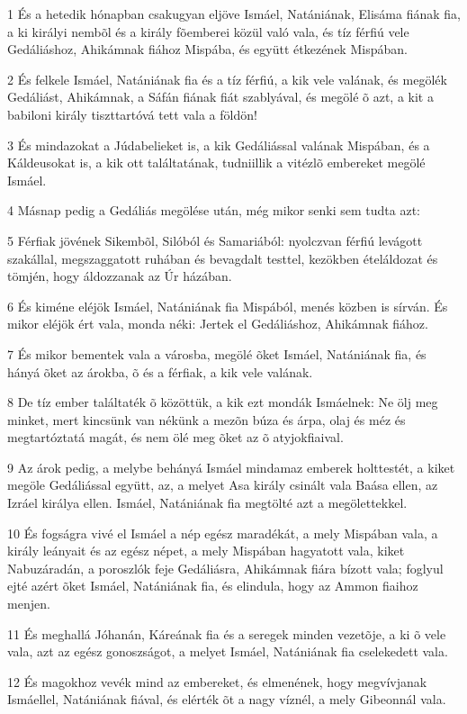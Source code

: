 \par 1 És a hetedik hónapban csakugyan eljöve Ismáel, Natániának, Elisáma fiának fia, a ki királyi nembõl és a király fõemberei közül való vala, és tíz férfiú vele Gedáliáshoz, Ahikámnak fiához Mispába, és együtt étkezének Mispában.
\par 2 És felkele Ismáel, Natániának fia és a tíz férfiú, a kik vele valának, és megölék Gedáliást, Ahikámnak, a Sáfán fiának fiát szablyával, és megölé õ azt, a kit a babiloni király tiszttartóvá tett vala a földön!
\par 3 És mindazokat a Júdabelieket is, a kik Gedáliással valának Mispában, és a Káldeusokat is, a kik ott találtatának, tudniillik a vitézlõ embereket megölé Ismáel.
\par 4 Másnap pedig a Gedáliás megölése után, még mikor senki sem tudta azt:
\par 5 Férfiak jövének Sikembõl, Silóból és Samariából: nyolczvan férfiú levágott szakállal, megszaggatott ruhában és bevagdalt testtel, kezökben ételáldozat és tömjén, hogy áldozzanak az Úr házában.
\par 6 És kiméne eléjök Ismáel, Natániának fia Mispából, menés közben is sírván. És mikor eléjök ért vala, monda néki: Jertek el Gedáliáshoz, Ahikámnak fiához.
\par 7 És mikor bementek vala a városba, megölé õket Ismáel, Natániának fia, és hányá õket az árokba, õ és a férfiak, a kik vele valának.
\par 8 De tíz ember találtaték õ közöttük, a kik ezt mondák Ismáelnek: Ne ölj meg minket, mert kincsünk van nékünk a mezõn búza és árpa, olaj és méz és megtartóztatá magát, és nem ölé meg õket az õ atyjokfiaival.
\par 9 Az árok pedig, a melybe behányá Ismáel mindamaz emberek holttestét, a kiket megöle Gedáliással együtt, az, a melyet Asa király csinált vala Baása ellen, az Izráel királya ellen. Ismáel, Natániának fia megtölté azt a megölettekkel.
\par 10 És fogságra vivé el Ismáel a nép egész maradékát, a mely Mispában vala, a király leányait és az egész népet, a mely Mispában hagyatott vala, kiket Nabuzáradán, a poroszlók feje Gedáliásra, Ahikámnak fiára bízott vala; foglyul ejté azért õket Ismáel, Natániának fia, és elindula, hogy az Ammon fiaihoz menjen.
\par 11 És meghallá Jóhanán, Káreának fia és a seregek minden vezetõje, a ki õ vele vala, azt az egész gonoszságot, a melyet Ismáel, Natániának fia cselekedett vala.
\par 12 És magokhoz vevék mind az embereket, és elmenének, hogy megvívjanak Ismáellel, Natániának fiával, és elérték õt a nagy víznél, a mely Gibeonnál vala.
